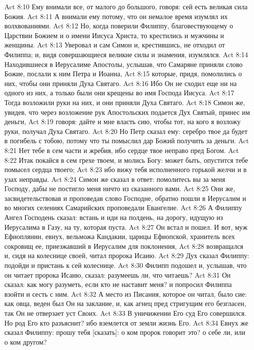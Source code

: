 Act 8:10  Ему внимали все, от малого до большого, говоря: сей есть великая сила Божия.
Act 8:11  А внимали ему потому, что он немалое время изумлял их волхвованиями.
Act 8:12  Но, когда поверили Филиппу, благовествующему о Царствии Божием и о имени Иисуса Христа, то крестились и мужчины и женщины.
Act 8:13  Уверовал и сам Симон и, крестившись, не отходил от Филиппа; и, видя совершающиеся великие силы и знамения, изумлялся.
Act 8:14  Находившиеся в Иерусалиме Апостолы, услышав, что Самаряне приняли слово Божие, послали к ним Петра и Иоанна,
Act 8:15  которые, придя, помолились о них, чтобы они приняли Духа Святаго.
Act 8:16  Ибо Он не сходил еще ни на одного из них, а только были они крещены во имя Господа Иисуса.
Act 8:17  Тогда возложили руки на них, и они приняли Духа Святаго.
Act 8:18  Симон же, увидев, что через возложение рук Апостольских подается Дух Святый, принес им деньги,
Act 8:19  говоря: дайте и мне власть сию, чтобы тот, на кого я возложу руки, получал Духа Святаго.
Act 8:20  Но Петр сказал ему: серебро твое да будет в погибель с тобою, потому что ты помыслил дар Божий получить за деньги.
Act 8:21  Нет тебе в сем части и жребия, ибо сердце твое неправо пред Богом.
Act 8:22  Итак покайся в сем грехе твоем, и молись Богу: может быть, опустится тебе помысел сердца твоего;
Act 8:23  ибо вижу тебя исполненного горькой желчи и в узах неправды.
Act 8:24  Симон же сказал в ответ: помолитесь вы за меня Господу, дабы не постигло меня ничто из сказанного вами.
Act 8:25  Они же, засвидетельствовав и проповедав слово Господне, обратно пошли в Иерусалим и во многих селениях Самарийских проповедали Евангелие.
Act 8:26  А Филиппу Ангел Господень сказал: встань и иди на полдень, на дорогу, идущую из Иерусалима в Газу, на ту, которая пуста.
Act 8:27  Он встал и пошел. И вот, муж Ефиоплянин, евнух, вельможа Кандакии, царицы Ефиопской, хранитель всех сокровищ ее, приезжавший в Иерусалим для поклонения,
Act 8:28  возвращался и, сидя на колеснице своей, читал пророка Исаию.
Act 8:29  Дух сказал Филиппу: подойди и пристань к сей колеснице.
Act 8:30  Филипп подошел и, услышав, что он читает пророка Исаию, сказал: разумеешь ли, что читаешь?
Act 8:31  Он сказал: как могу разуметь, если кто не наставит меня? и попросил Филиппа взойти и сесть с ним.
Act 8:32  А место из Писания, которое он читал, было сие: как овца, веден был Он на заклание, и, как агнец пред стригущим его безгласен, так Он не отверзает уст Своих.
Act 8:33  В уничижении Его суд Его совершился. Но род Его кто разъяснит? ибо вземлется от земли жизнь Его.
Act 8:34  Евнух же сказал Филиппу: прошу тебя [сказать]: о ком пророк говорит это? о себе ли, или о ком другом?
